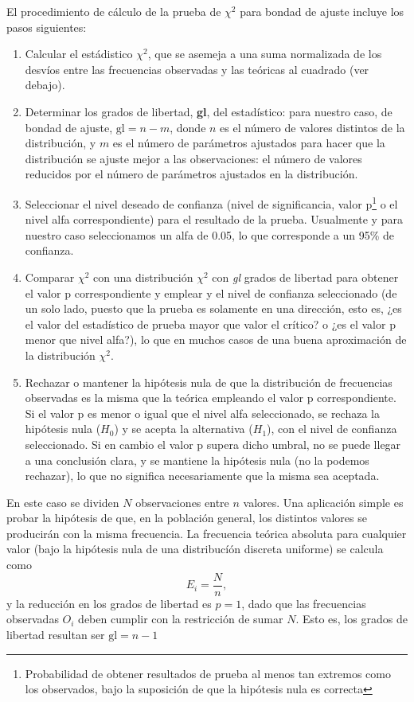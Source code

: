 El procedimiento de cálculo de la prueba de $\chi^{2}$ para bondad de ajuste incluye los pasos siguientes:
\begin{enumerate}
  \item Calcular el estádistico $\chi^{2}$, que se asemeja a una suma normalizada de los desvíos entre las frecuencias observadas y las teóricas al cuadrado (ver debajo).
  \item Determinar los grados de libertad, \textbf{gl}, del estadístico: para nuestro caso, de bondad de ajuste, $\text{gl} = n - m$, donde $n$ es el número de valores distintos de la distribución, y $m$ es el número de parámetros ajustados para hacer que la distribución se ajuste mejor a las observaciones: el número de valores reducidos por el número de parámetros ajustados en la distribución.
  \item Seleccionar el nivel deseado de confianza (nivel de significancia, valor p\footnote{Probabilidad de obtener resultados de prueba al menos tan extremos como los observados, bajo la suposición de que la hipótesis nula es correcta\cite{enwiki2022pvalue}} o el nivel alfa correspondiente) para el resultado de la prueba. Usualmente y para nuestro caso seleccionamos un alfa de 0.05, lo que corresponde a un 95\% de confianza.
  \item Comparar $\chi^{2}$ con una distribución $\chi^{2}$ con \emph{gl} grados de libertad para obtener el valor p correspondiente y emplear y el nivel de confianza seleccionado (de un solo lado, puesto que la prueba es solamente en una dirección, esto es, ¿es el valor del estadístico de prueba mayor que valor el crítico? o ¿es el valor p menor que nivel alfa?), lo que en muchos casos de una buena aproximación de la distribución $\chi^{2}$.
  \item Rechazar o mantener la hipótesis nula de que la distribución de frecuencias observadas es la misma que la teórica empleando el valor p correspondiente. Si el valor p es menor o igual que el nivel alfa seleccionado, se rechaza la hipótesis nula ($H_{0}$) y se acepta la alternativa ($H_{1}$), con el nivel de confianza seleccionado. Si en cambio el valor p supera dicho umbral, no se puede llegar a una conclusión clara, y se mantiene la hipótesis nula (no la podemos rechazar), lo que no significa necesariamente que la misma sea aceptada.
\end{enumerate}

En este caso se dividen $N$ observaciones entre $n$ valores. Una aplicación simple es probar la hipótesis de que, en la población general, los distintos valores se producirán con la misma frecuencia. La frecuencia teórica absoluta para cualquier valor (bajo la hipótesis nula de una distribucíón discreta uniforme) se calcula como
\begin{equation*}
  E_i=\frac{N}{n},
\end{equation*}
y la reducción en los grados de libertad es $p=1$, dado que las frecuencias observadas $O_{i}$ deben cumplir con la restricción de sumar $N$. Esto es, los grados de libertad resultan ser $\text{gl} = n - 1$


